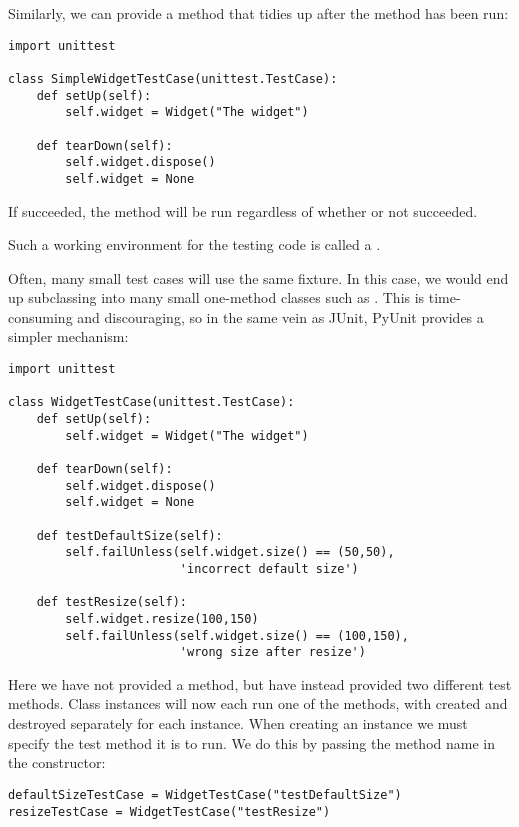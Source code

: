 Similarly, we can provide a  method that tidies up
after the  method has been run:

\begin{verbatim}
import unittest

class SimpleWidgetTestCase(unittest.TestCase):
    def setUp(self):
        self.widget = Widget("The widget")

    def tearDown(self):
        self.widget.dispose()
        self.widget = None
\end{verbatim}

If  succeeded, the  method will be
run regardless of whether or not  succeeded.

Such a working environment for the testing code is called a
.

Often, many small test cases will use the same fixture.  In this case,
we would end up subclassing  into many
small one-method classes such as
.  This is time-consuming and
discouraging, so in the same vein as JUnit, PyUnit provides a simpler
mechanism:

\begin{verbatim}
import unittest

class WidgetTestCase(unittest.TestCase):
    def setUp(self):
        self.widget = Widget("The widget")

    def tearDown(self):
        self.widget.dispose()
        self.widget = None

    def testDefaultSize(self):
        self.failUnless(self.widget.size() == (50,50),
                        'incorrect default size')

    def testResize(self):
        self.widget.resize(100,150)
        self.failUnless(self.widget.size() == (100,150),
                        'wrong size after resize')
\end{verbatim}

Here we have not provided a  method, but have
instead provided two different test methods.  Class instances will now
each run one of the   methods, with 
created and destroyed separately for each instance.  When creating an
instance we must specify the test method it is to run.  We do this by
passing the method name in the constructor:

\begin{verbatim}
defaultSizeTestCase = WidgetTestCase("testDefaultSize")
resizeTestCase = WidgetTestCase("testResize")
\end{verbatim}

